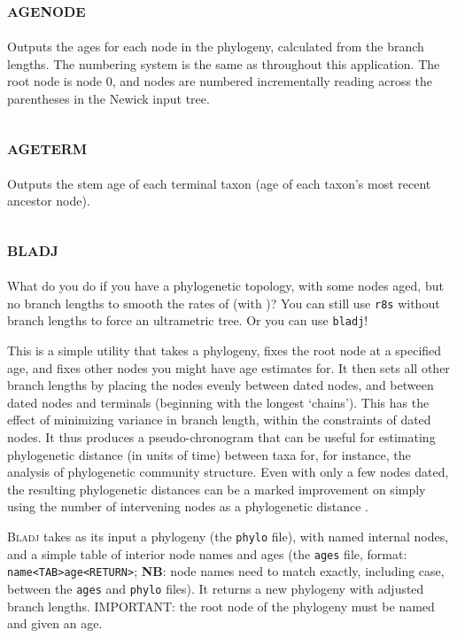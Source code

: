 \documentclass[12pt,letterpaper]{article}
\begin{document}
\subsection{\scshape agenode}

Outputs the ages for each node in the phylogeny, calculated from the
branch lengths. The numbering system is the same as throughout this
application. The root node is node 0, and nodes are numbered
incrementally reading across the parentheses in the Newick input tree.

\subsection{\scshape ageterm}

Outputs the stem age of each terminal taxon (age of each taxon's most
recent ancestor node).

\subsection{\scshape bladj}

What do you do if you have a phylogenetic topology, with some nodes
aged, but no branch lengths to smooth the rates of (with
)?
You can still use \verb|r8s| without branch lengths to force an
ultrametric tree. Or you can use \verb|bladj|!

This is a simple utility that takes a phylogeny, fixes the root node
at a specified age, and fixes other nodes you might have age estimates
for. It then sets all other branch lengths by placing the nodes evenly
between dated nodes, and between dated nodes and terminals (beginning
with the longest `chains'). This has the effect of minimizing variance
in branch length, within the constraints of dated nodes. It thus
produces a pseudo-chronogram that can be useful for estimating
phylogenetic distance (in units of time) between taxa for, for
instance, the analysis of phylogenetic community structure. Even with
only a few nodes dated, the resulting phylogenetic distances can be a
marked improvement on simply using the number of intervening nodes as
a phylogenetic distance \citep[see][]{webb2000exp}.

{\scshape Bladj} takes as its input a phylogeny (the \verb|phylo|
file), with named internal nodes, and a simple table of interior node
names and ages (the \verb|ages| file, format:
\verb|name<TAB>age<RETURN>|; {\bf NB}: node names need to match
exactly, including case, between the \verb|ages| and \verb|phylo|
files). It returns a new phylogeny with adjusted branch lengths.
IMPORTANT: the root node of the phylogeny must be named and given an
age.
\end{document}
